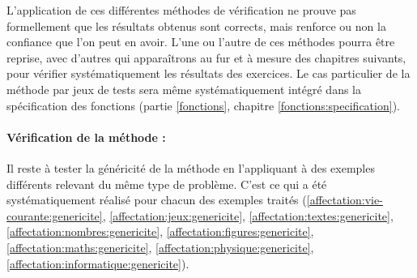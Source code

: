 L'application de ces différentes méthodes de vérification ne prouve pas formellement 
que les résultats obtenus sont corrects, mais renforce ou non la confiance que l'on 
peut en avoir. 
L'une ou l'autre de ces méthodes pourra être reprise, avec d'autres qui apparaîtrons au fur 
et à mesure des chapitres suivants, pour vérifier systématiquement les résultats des exercices.
Le cas particulier de la méthode par jeux de tests sera même systématiquement intégré
dans la spécification des fonctions (partie \ref{fonctions}, chapitre \ref{fonctions:specification}).

\paragraph{Vérification de la méthode :}
Il reste à tester la généricité de la méthode en l'appliquant
à des exemples différents relevant du même type de problème.
C'est ce qui a été systématiquement réalisé pour chacun des exemples traités
(\ref{affectation:vie-courante:genericite}, \ref{affectation:jeux:genericite}, 
\ref{affectation:textes:genericite}, \ref{affectation:nombres:genericite}, 
\ref{affectation:figures:genericite}, \ref{affectation:maths:genericite}, 
\ref{affectation:physique:genericite}, \ref{affectation:informatique:genericite}).
